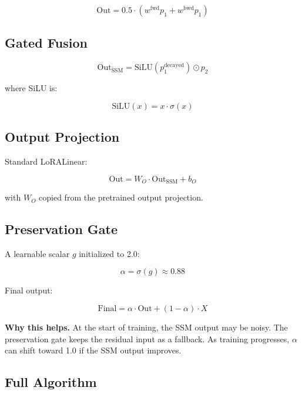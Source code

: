 \[
\text{Out} = 0.5 \cdot (w^\text{fwd} p_1 + w^\text{bwd} p_1)
\tag{4.9}
\]

\subsection{Gated Fusion}

\[
\text{Out}_\text{SSM} = \text{SiLU}(p_1^\text{decayed}) \odot p_2
\tag{4.10}
\]

where SiLU is:

\[
\text{SiLU}(x) = x \cdot \sigma(x)
\tag{4.11}
\]

\subsection{Output Projection}

Standard LoRALinear:

\[
\text{Out} = W_O \cdot \text{Out}_\text{SSM} + b_O
\tag{4.12}
\]

with $W_O$ copied from the pretrained output projection.

\subsection{Preservation Gate}

A learnable scalar $g$ initialized to 2.0:

\[
\alpha = \sigma(g) \approx 0.88
\tag{4.13}
\]

Final output:

\[
\text{Final} = \alpha \cdot \text{Out} + (1 - \alpha) \cdot X
\tag{4.14}
\]

\textbf{Why this helps.} At the start of training, the SSM output may be noisy. 
The preservation gate keeps the residual input as a fallback. As training 
progresses, $\alpha$ can shift toward 1.0 if the SSM output improves.

\subsection{Full Algorithm}

